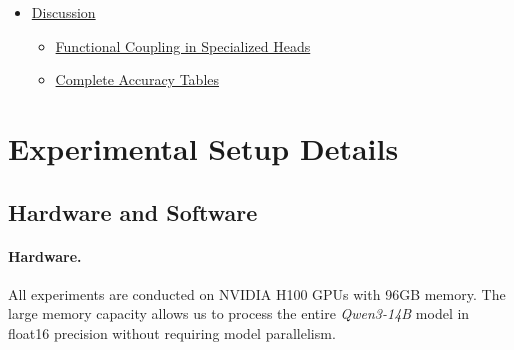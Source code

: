\documentclass[11pt]{article}
\begin{document}
\begin{itemize}
\begin{itemize}
		        \item[\ref{sec:failure_analysis}] \hyperref[sec:failure_analysis]{Failure Case Analysis}
		    \end{itemize}
	        \item[\ref{sec:appendix_discussion}] \hyperref[sec:appendix_discussion]{Discussion}
    \begin{itemize}
        \item[\ref{sec:appendix_func_couple}] \hyperref[sec:appendix_func_couple]{Functional Coupling in Specialized Heads}
        \item[\ref{sec:appendix_full_accuracy}] \hyperref[sec:appendix_full_accuracy]{Complete Accuracy Tables}
    \end{itemize}
\end{itemize}


\section{Experimental Setup Details}
\label{sec:appendix_setup}

\subsection{Hardware and Software}
\label{sec:appendix_hardware}            

\paragraph{Hardware.}
All experiments are conducted on NVIDIA H100 GPUs with 96GB memory. The large memory capacity allows us to process the entire \textit{Qwen3-14B} model in float16 precision without requiring model parallelism.
\end{document}
